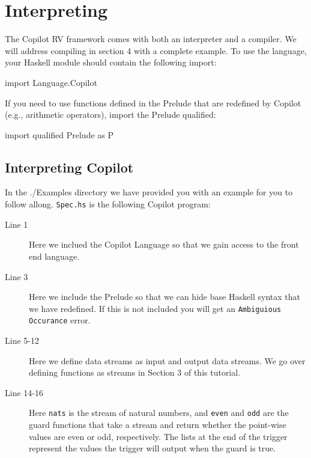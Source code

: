 \newpage 
\section{Interpreting}
\label{interpcompile}
The Copilot RV framework comes with both an interpreter and a
compiler. We will address compiling in section 4 with a complete example. 
\noindent To use the language, your Haskell module should contain the following import:
%
\begin{code}
import Language.Copilot
\end{code}
%
If you need to use functions defined in the Prelude that are redefined by
Copilot (e.g., arithmetic operators), import the Prelude qualified:
%
\begin{code}
import qualified Prelude as P
\end{code}

\subsection{Interpreting Copilot}
In the ./Examples directory we have provided you with an example
for you to follow allong. \texttt{Spec.hs} is the following Copilot program:
%

%
%
%
%
%
\begin{description}
  \item[Line 1] Here we inclued the Copilot Language so that we gain access to the
  front end language.
  \item[Line 3] Here we include the Prelude so that we can hide base Haskell syntax
  that we have redefined. If this is not included you will get an \texttt{Ambiguious
  Occurance} error. 
  \item[Line 5-12] Here we define data streams as input and output data streams. We
  go over defining functions as streams in Section 3 of this tutorial. 
  \item[Line 14-16] Here {\tt nats} is the stream of natural numbers, and {\tt even} and {\tt odd}
  are the guard functions that take a stream and return whether the point-wise
  values are even or odd, respectively. The lists at the end of the trigger
  represent the values the trigger will output when the guard is true.

\end{description}

